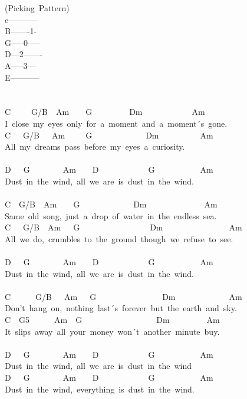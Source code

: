 \documentclass[]{book}
\begin{document}
(Picking~Pattern)\\
e\textbar-----------\textbar{}\\
B-------1-\textbar{}\\
G\textbar-----0-----\textbar{}\\
D\textbar---2-------\textbar{}\\
A-----3---\textbar{}\\
E\textbar-----------\textbar{}\\
~\\
~\\
\hspace*{0.333em}\hspace*{0.333em}C~~~~~G/B~~Am~~~~G~~~~~~~~~Dm~~~~~~~~~~~~Am\\
I~close~my~eyes~only~for~a~moment~and~a~moment´s~gone.\\
C~~~G/B~~~Am~~~~~G~~~~~~~~~~~~~Dm~~~~~~~~~~Am\\
All~my~dreams~pass~before~my~eyes~a~curiosity.\\
~\\
D~~~G~~~~~~~~Am~~~~D~~~~~~~~~~~~G~~~~~~~~~~~Am\\
Dust~in~the~wind,~all~we~are~is~dust~in~the~wind.\\
~\\
C~~G/B~~Am~~~~G~~~~~~~~~~~~~Dm~~~~~~~~~~~~~~Am\\
Same~old~song,~just~a~drop~of~water~in~the~endless~sea.\\
C~~~G/B~~Am~~~G~~~~~~~~~~~~~~~~~Dm~~~~~~~~~~~~~~~~Am\\
All~we~do,~crumbles~to~the~ground~though~we~refuse~to~see.\\
~\\
D~~~G~~~~~~~~Am~~~~D~~~~~~~~~~~~G~~~~~~~~~~~Am\\
Dust~in~the~wind,~all~we~are~is~dust~in~the~wind.\\
~\\
C~~~~~~G/B~~~Am~~~G~~~~~~~~~~~~~~~~Dm~~~~~~~~~~~~~Am\\
Don't~hang~on,~nothing~last´s~forever~but~the~earth~and~sky.\\
C~~G5~~~~~~Am~~G~~~~~~~~~~~~~~~~~~Dm~~~~~~~~~Am\\
It~slips~away~all~your~money~won´t~another~minute~buy.\\
~\\
D~~~G~~~~~~~~Am~~~~D~~~~~~~~~~~~G~~~~~~~~~~~Am\\
Dust~in~the~wind,~all~we~are~is~dust~in~the~wind\\
D~~~G~~~~~~~~Am~~~~D~~~~~~~~~~~~G~~~~~~~~~~~Am\\
Dust~in~the~wind,~everything~is~dust~in~the~wind.\\
~\\
~\\
\end{document}
